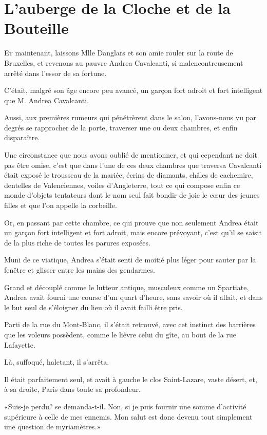 \chapter{L'auberge de la Cloche et de la Bouteille}

\lettrine{E}{t} maintenant, laissons Mlle Danglars et son amie rouler sur la route de Bruxelles, et revenons au pauvre Andrea Cavalcanti, si malencontreusement arrêté dans l'essor de sa fortune. 

\zz
C'était, malgré son âge encore peu avancé, un garçon fort adroit et fort intelligent que M. Andrea Cavalcanti. 

Aussi, aux premières rumeurs qui pénétrèrent dans le salon, l'avons-nous vu par degrés se rapprocher de la porte, traverser une ou deux chambres, et enfin disparaître. 

Une circonstance que nous avons oublié de mentionner, et qui cependant ne doit pas être omise, c'est que dans l'une de ces deux chambres que traversa Cavalcanti était exposé le trousseau de la mariée, écrins de diamants, châles de cachemire, dentelles de Valenciennes, voiles d'Angleterre, tout ce qui compose enfin ce monde d'objets tentateurs dont le nom seul fait bondir de joie le cœur des jeunes filles et que l'on appelle la corbeille. 

Or, en passant par cette chambre, ce qui prouve que non seulement Andrea était un garçon fort intelligent et fort adroit, mais encore prévoyant, c'est qu'il se saisit de la plus riche de toutes les parures exposées. 

Muni de ce viatique, Andrea s'était senti de moitié plus léger pour sauter par la fenêtre et glisser entre les mains des gendarmes. 

Grand et découplé comme le lutteur antique, musculeux comme un Spartiate, Andrea avait fourni une course d'un quart d'heure, sans savoir où il allait, et dans le but seul de s'éloigner du lieu où il avait failli être pris. 

Parti de la rue du Mont-Blanc, il s'était retrouvé, avec cet instinct des barrières que les voleurs possèdent, comme le lièvre celui du gîte, au bout de la rue Lafayette. 

Là, suffoqué, haletant, il s'arrêta. 

Il était parfaitement seul, et avait à gauche le clos Saint-Lazare, vaste désert, et, à sa droite, Paris dans toute sa profondeur. 

«Suis-je perdu? se demanda-t-il. Non, si je puis fournir une somme d'activité supérieure à celle de mes ennemis. Mon salut est donc devenu tout simplement une question de myriamètres.» 

